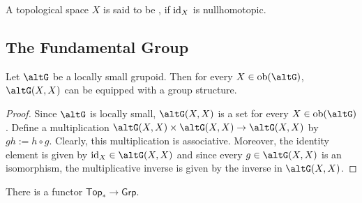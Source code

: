 \begin{definition}[Contractible]
	A topological space $X$ is said to be , if $\operatorname{id}_X$ is nullhomotopic.
\end{definition}

\subsection*{The Fundamental Group}

\begin{lemma}
	Let $\mathcal{\altG}$ be a locally small grupoid. Then for every $X \in \ob(\mathcal{\altG})$, $\mathcal{\altG}(X,X)$ can be equipped with a group structure.
	\label{lem:groupoid_group}
\end{lemma}

\begin{proof}
	Since $\mathcal{\altG}$ is locally small, $\mathcal{\altG}(X,X)$ is a set for every $X \in \ob(\mathcal{\altG})$. Define a multiplication $\mathcal{\altG}(X,X) \times \mathcal{\altG}(X,X) \to \mathcal{\altG}(X,X)$ by $gh := h \circ g$. Clearly, this multiplication is associative. Moreover, the identity element is given by $\id_X \in \mathcal{\altG}(X,X)$ and since every $g \in \mathcal{\altG}(X,X)$ is an isomorphism, the multiplicative inverse is given by the inverse in $\mathcal{\altG}(X,X)$. 
\end{proof}

\begin{proposition}
	There is a functor $\mathsf{Top}_\ast \to \mathsf{Grp}$.
\end{proposition}

